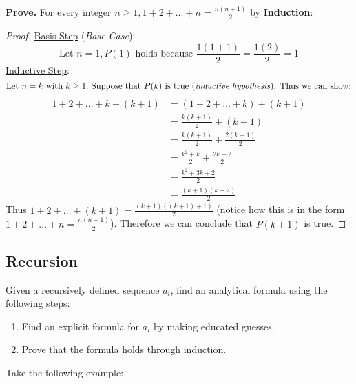 \documentclass[a4paper]{article}
\begin{document}
  \textbf{Prove.} For every integer $n \geq 1, 1+2+\dots+n= \frac{n(n+1 )}{2}$ by \textbf{Induction}:

  \begin{proof}
    \underline{Basis Step} (\textit{Base Case}):
    \begin{displaymath}
      \textrm{Let } n = 1, P(1) \textrm{ holds because } \frac{1(1+1 )}{2} = \frac{1(2)}{2} = 1
    \end{displaymath}
    \underline{Inductive Step}:
    \begin{displaymath}
      \textrm{Let } n = k \textrm{ with } k \geq 1. \textrm{ Suppose that } P(k) \textrm{ is true (\textit{inductive hypothesis}). Thus we can show:}
    \end{displaymath}
    \begin{equation*}
      \begin{split}
        1+2+\dots+k+(k+1)&=(1+2+\dots+k)+(k+1)\\
                         &=\frac{k(k+1)}{2} +(k+1) \\
                         &=\frac{k(k+1 )}{2} +\frac{2(k+1 )}{2}\\
                         &=\frac{k^2 + k }{2} + \frac{2k+2 }{2} \\
                         &=\frac{k^2 + 3k +2 }{2}\\
                         &= \frac{(k+1)(k+2)}{2}
      \end{split}
    \end{equation*}
    Thus $1+2+\dots+(k+1) = \frac{(k+1)((k+1)+1)}{2}$ (notice how this is in the form $1+2+\dots+n=\frac{n(n+1 )}{2}$). Therefore we can conclude that $P(k+1)$ is true.
  \end{proof}
  \subsection{Recursion}
  Given a recursively defined sequence $a_i$, find an analytical formula using the following steps:
  \begin{enumerate}
    \item Find an explicit formula for $a_i$ by making educated guesses.
    \item Prove that the formula holds through induction.
  \end{enumerate}
  Take the following example:
\end{document}
